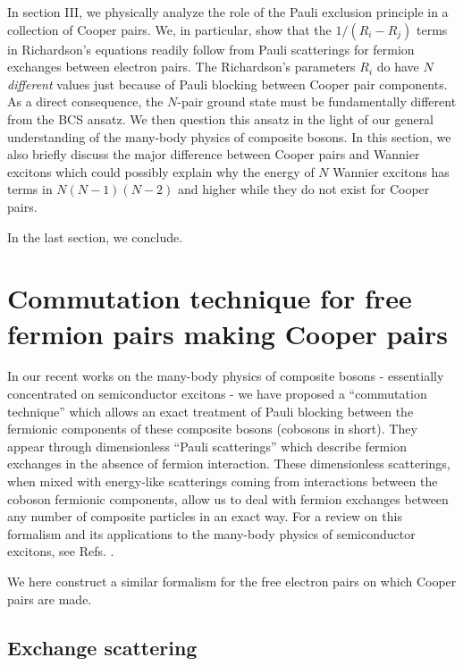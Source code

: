 \documentclass[epj]{svjour}
\begin{document}
In section III,  we physically analyze the role of the Pauli exclusion principle in a collection of Cooper pairs. We, in particular, show that the $1/(R_i-R_j)$ terms in Richardson's equations readily follow
from Pauli scatterings for fermion exchanges 
between electron pairs. The Richardson's parameters $R_i$  do have $N$ \emph{different} values just because 
of Pauli blocking between Cooper pair components. As a direct consequence, the $N$-pair ground state must be fundamentally different from the BCS ansatz. We then question this ansatz in the light of our general understanding of the many-body physics of composite bosons. In this section, we also briefly discuss the major difference between Cooper pairs and Wannier excitons which could possibly explain why the energy of $N$ Wannier excitons has terms in $N(N-1)(N-2)$ and higher while they do not exist for Cooper pairs.

In the last section, we conclude.








\section{Commutation technique for free fermion pairs making Cooper pairs\label{sec:beta}}

In our recent works on the many-body physics of composite bosons - essentially concentrated on semiconductor excitons - we have
proposed a ``commutation technique'' which allows an exact treatment of Pauli blocking between the fermionic components of these composite
bosons (cobosons in short). They appear through dimensionless ``Pauli scatterings'' which describe fermion
exchanges in the absence of fermion interaction. These dimensionless
scatterings, when mixed with energy-like scatterings coming from interactions
between the coboson fermionic components, allow us to deal with fermion exchanges
between any number of composite particles in an exact way. For a review on
this formalism and its applications to the many-body physics of
semiconductor excitons, see Refs. \cite%
{CobosonPhysicsReports}.

We here construct a similar formalism for the free electron pairs on which Cooper pairs are made.


\subsection{Exchange scattering}
\end{document}

